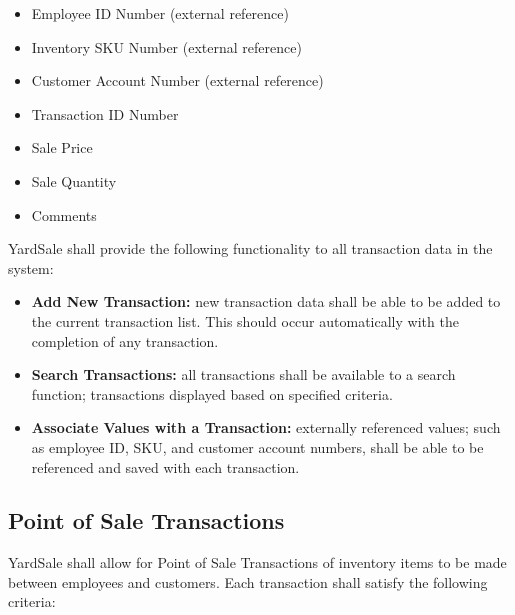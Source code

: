 \documentclass{report}
\begin{document}
                \begin{itemize}
                    \item Employee ID Number (external reference)
                    \item Inventory SKU Number (external
                    reference)
                    \item Customer Account Number (external
                    reference)
                    \item Transaction ID Number
                    \item Sale Price
                    \item Sale Quantity
                    \item Comments
                \end{itemize}

                \noindent YardSale shall provide the following functionality
                to all transaction data in the system:

                \begin{itemize}
                    \item {\bf Add New Transaction:} new
                    transaction data shall be able to be
                    added to the current transaction list.  This
                    should occur automatically with the completion
                    of any transaction.
                    \item {\bf Search Transactions:} all
                    transactions shall be available to a search function;
                    transactions displayed based on specified criteria.
                    \item {\bf Associate Values with a
                    Transaction:} externally referenced values;
                    such as employee ID, SKU, and customer
                    account numbers, shall be able to be
                    referenced and saved with each transaction.
                \end{itemize}


        \subsection{Point of Sale Transactions}
            YardSale shall allow for Point of Sale Transactions of inventory items
            to be made between employees and customers.  Each
            transaction shall satisfy the following criteria:
\end{document}
